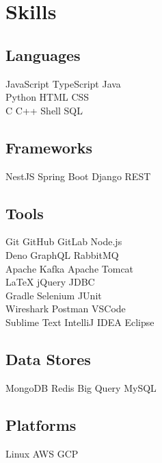 \documentclass[]{deedy-resume-openfont}
\begin{document}
\begin{minipage}[t]{0.33\textwidth} 


\section{Skills}
\subsection{Languages}
JavaScript \textbullet{} TypeScript \textbullet Java \\ 
\textbullet{} Python \textbullet{} HTML \textbullet{} CSS \\ 
\textbullet{} C \textbullet{} C++ \textbullet{} Shell \textbullet{} SQL \\

\subsection{Frameworks}
NestJS \textbullet{} Spring Boot \textbullet{} Django REST\\

\subsection{Tools}
Git \textbullet{} GitHub  \textbullet{} GitLab  \textbullet{} Node.js \\
\textbullet{} Deno \textbullet{} GraphQL \textbullet{} RabbitMQ\\
\textbullet{} Apache Kafka \textbullet{} Apache Tomcat \\
\textbullet{} LaTeX \textbullet{} jQuery \textbullet{} JDBC \\
\textbullet{} Gradle \textbullet{} Selenium \textbullet{} JUnit  \\ 
\textbullet{} Wireshark \textbullet{} Postman \textbullet{} VSCode \\
\textbullet{} Sublime Text \textbullet{} IntelliJ IDEA \textbullet{} Eclipse 
\sectionsep

\subsection{Data Stores}
MongoDB \textbullet{} Redis \textbullet{} Big Query \textbullet{} MySQL
\sectionsep

\subsection{Platforms}
Linux \textbullet{} AWS \textbullet{} GCP 
\sectionsep


\end{minipage}
\end{document}
